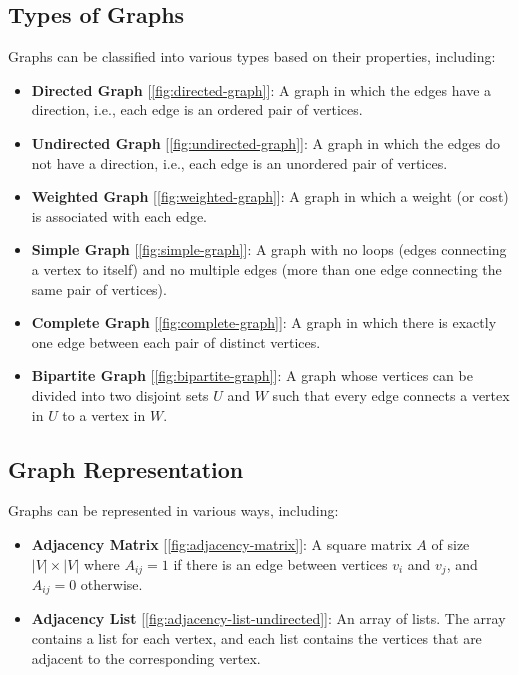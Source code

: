 \subsection{Types of Graphs}
Graphs can be classified into various types based on their properties, including:
\begin{itemize}
    \item \textbf{Directed Graph} [\autoref{fig:directed-graph}]: A graph in which the edges have a direction, i.e., each edge is an ordered pair of vertices.
    
    \item \textbf{Undirected Graph} [\autoref{fig:undirected-graph}]: A graph in which the edges do not have a direction, i.e., each edge is an unordered pair of vertices.
    
    
    \item \textbf{Weighted Graph} [\autoref{fig:weighted-graph}]: A graph in which a weight (or cost) is associated with each edge.
    
    
    \item \textbf{Simple Graph} [\autoref{fig:simple-graph}]: A graph with no loops (edges connecting a vertex to itself) and no multiple edges (more than one edge connecting the same pair of vertices).
    
    
    \item \textbf{Complete Graph} [\autoref{fig:complete-graph}]: A graph in which there is exactly one edge between each pair of distinct vertices.
    

    \item \textbf{Bipartite Graph} [\autoref{fig:bipartite-graph}]: A graph whose vertices can be divided into two disjoint sets $U$ and $W$ such that every edge connects a vertex in $U$ to a vertex in $W$.
    
\end{itemize}

\subsection{Graph Representation}
Graphs can be represented in various ways, including:
\begin{itemize}
    \item \textbf{Adjacency Matrix} [\autoref{fig:adjacency-matrix}]: A square matrix $A$ of size $|V| \times |V|$ where $A_{ij} = 1$ if there is an edge between vertices $v_i$ and $v_j$, and $A_{ij} = 0$ otherwise.
    
    
    \item \textbf{Adjacency List} [\autoref{fig:adjacency-list-undirected}]: An array of lists. The array contains a list for each vertex, and each list contains the vertices that are adjacent to the corresponding vertex.
    
\end{itemize}
